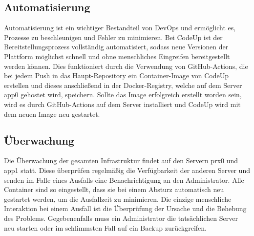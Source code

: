 \documentclass[main.tex]{subfiles}
\begin{document}
    \subsection{Automatisierung}
    Automatisierung ist ein wichtiger Bestandteil von DevOps und ermöglicht es, Prozesse zu beschleunigen und Fehler zu minimieren.
    Bei CodeUp ist der Bereitstellungsprozess vollständig automatisiert, sodass neue Versionen der Plattform möglichst schnell und ohne menschliches Eingreifen bereitgestellt werden können.
    Dies funktioniert durch die Verwendung von GitHub-Actions, die bei jedem Push in das Haupt-Repository ein Container-Image von CodeUp erstellen und dieses anschließend in der Docker-Registry, welche auf dem Server app0 gehostet wird, speichern.
    Sollte das Image erfolgreich erstellt worden sein, wird es durch GitHub-Actions auf dem Server installiert und CodeUp wird mit dem neuen Image neu gestartet.
    \subsection{Überwachung}
    Die Überwachung der gesamten Infrastruktur findet auf den Servern prx0 und app1 statt.
    Diese überprüfen regelmäßig die Verfügbarkeit der anderen Server und senden im Falle eines Ausfalls eine Benachrichtigung an den Administrator.
    Alle Container sind so eingestellt, dass sie bei einem Absturz automatisch neu gestartet werden, um die Ausfallzeit zu minimieren.
    Die einzige menschliche Interaktion bei einem Ausfall ist die Überprüfung der Ursache und die Behebung des Problems.
    Gegebenenfalls muss ein Administrator die tatsächlichen Server neu starten oder im schlimmsten Fall auf ein Backup zurückgreifen.
\end{document}
